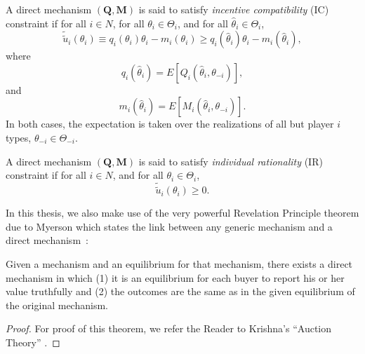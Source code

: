 A direct mechanism $(\mathbf{Q},\mathbf{M})$ is said to satisfy \emph{incentive compatibility} (IC) constraint if for all $i\in N$, for all $\theta_i\in\Theta_i$, and for all $\hat{\theta}_i\in\Theta_i$,
\begin{equation*}
  \tilde{\tilde{u}}_i(\theta_i) \equiv q_i(\theta_i)\theta_i - m_i(\theta_i)\ge q_i(\hat{\theta}_i)\theta_i - m_i(\hat{\theta}_i),
\end{equation*}
where
\begin{equation*}
  q_i(\hat{\theta}_i) = E[Q_i(\hat{\theta}_i,\theta_{-i})],
\end{equation*}
and
\begin{equation*}
  m_i(\hat{\theta}_i) = E[M_i(\hat{\theta}_i, \theta_{-i})].
\end{equation*}
In both cases, the expectation is taken over the realizations of all but player $i$ types, $\theta_{-i}\in\Theta_{-i}$.

A direct mechanism $(\mathbf{Q}, \mathbf{M})$ is said to satisfy \emph{individual rationality} (IR) constraint if for all $i\in N$, and for all $\theta_i\in\Theta_i$,
\begin{equation*}
  \tilde{\tilde{u}}_i(\theta_i)\ge 0.
\end{equation*}

In this thesis, we also make use of the very powerful Revelation Principle theorem due to Myerson which states the link between any generic mechanism and a direct mechanism~\cite{Myerson1979, Krishna10}:
\begin{thm}
\label{thm:revelation_principle_notation}
Given a mechanism and an equilibrium for that mechanism, there exists a direct mechanism in which (1) it is an equilibrium for each buyer to report his or her value truthfully and (2) the outcomes are the same as in the given equilibrium of the original mechanism.
\end{thm}
\begin{proof}
For proof of this theorem, we refer the Reader to Krishna's ``Auction Theory'' \cite{Krishna10}.
\end{proof}


